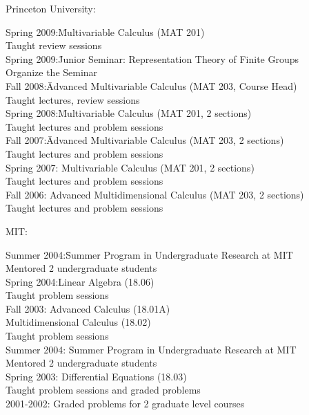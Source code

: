 \documentclass[11pt]{amsart}
\theoremstyle{plain}
\theoremstyle{definition}
\theoremstyle{remark}
\begin{document}
\noindent Princeton University:
\begin{tabbing}
Spring 2009:\quad\quad \=Multivariable Calculus (MAT
201)
\\ \>Taught  review sessions\\

Spring 2009:\quad\quad \=Junior Seminar: Representation Theory of Finite Groups
\\ \>Organize the Seminar\\



Fall 2008:\quad\quad\quad \=Advanced Multivariable Calculus (MAT
203, Course Head)
\\ \>Taught lectures, review sessions\\


Spring 2008:\quad\quad \= Multivariable Calculus (MAT
201, 2 sections)
\\ \>Taught lectures and problem sessions\\


Fall 2007:\quad\quad\quad \=Advanced Multivariable Calculus (MAT
203, 2 sections)
\\ \>Taught lectures and problem sessions\\

Spring 2007:\> Multivariable Calculus (MAT 201, 2 sections) \\
\>Taught lectures
and problem sessions\\

Fall 2006:\> Advanced Multidimensional Calculus (MAT 203, 2
sections)\\ \>Taught lectures and problem sessions \\
\end{tabbing}

\medskip \noindent MIT:

\begin{tabbing}
Summer 2004:\quad\=Summer Program in Undergraduate Research at
                   MIT\\\>
Mentored 2 undergraduate students \\
Spring 2004:\>Linear Algebra (18.06)\\ \> Taught problem sessions\\
Fall 2003:\>
          Advanced Calculus (18.01A)\\ \>
         Multidimensional Calculus (18.02)\\ \>
         Taught problem sessions\\
Summer 2004: \> Summer
Program in Undergraduate Research at MIT\\
\> Mentored 2 undergraduate students\\
Spring 2003:\> Differential Equations (18.03) \\ \> Taught problem
sessions and graded problems\\
2001-2002:\> Graded problems for 2 graduate level courses
\end{tabbing}
\end{document}
